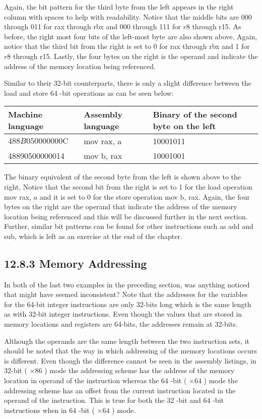 \documentclass[10pt]{article}
\begin{document}
Again, the bit pattern for the third byte from the left appears in the right column with spaces to help with readability. Notice that the middle bits are 000 through 011 for rax through rbx and 000 through 111 for $r 8$ through r15. As before, the right most four bits of the left-most byte are also shown above. Again, notice that the third bit from the right is set to 0 for rax through rbx and 1 for $r 8$ through r15. Lastly, the four bytes on the right is the operand and indicate the address of the memory location being referenced.

Similar to their 32-bit counterparts, there is only a slight difference between the load and store 64 -bit operations as can be seen below:

\begin{center}
\begin{tabular}{|l|l|l|}
\hline
Machine language & Assembly language & Binary of the second byte on the left \\
\hline
$488 B 050000000 \mathrm{C}$ & mov rax, a & 10001011 \\
\hline
48890500000014 & mov b, rax & 10001001 \\
\hline
\end{tabular}
\end{center}

The binary equivalent of the second byte from the left is shown above to the right, Notice that the second bit from the right is set to 1 for the load operation mov rax, $a$ and it is set to 0 for the store operation mov b, rax. Again, the four bytes on the right are the operand that indicate the address of the memory location being referenced and this will be discussed further in the next section. Further, similar bit patterns can be found for other instructions such as add and sub, which is left as an exercise at the end of the chapter.

\subsection*{12.8.3 Memory Addressing}
In both of the last two examples in the preceding section, was anything noticed that might have seemed inconsistent? Note that the addresses for the variables for the 64-bit integer instructions are only 32-bits long which is the same length as with 32-bit integer instructions. Even though the values that are stored in memory locations and registers are 64-bits, the addresses remain at 32-bits.

Although the operands are the same length between the two instruction sets, it should be noted that the way in which addressing of the memory locations occurs is different. Even though the difference cannot be seen in the assembly listings, in 32-bit ( $\times 86$ ) mode the addressing scheme has the address of the memory location in operand of the instruction whereas the 64 -bit ( $\times 64$ ) mode the addressing scheme has an offset from the current instruction located in the operand of the instruction. This is true for both the 32 -bit and 64 -bit instructions when in 64 -bit ( $\times 64$ ) mode.
\end{document}
